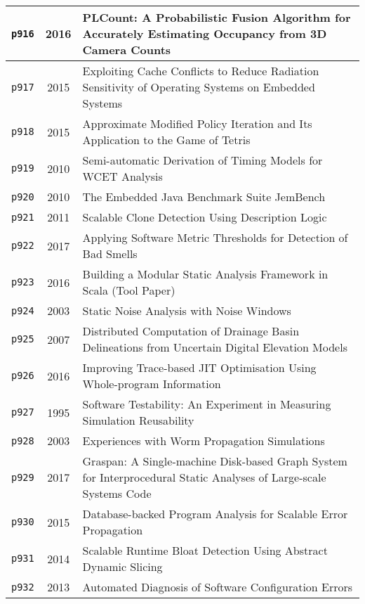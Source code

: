 \begin{longtable}{| c | c | p{16cm} |}
  \hline
  \texttt{p916} & 2016 & PLCount: A Probabilistic Fusion Algorithm for Accurately Estimating Occupancy from 3D Camera Counts \\
  \hline
  \texttt{p917} & 2015 & Exploiting Cache Conflicts to Reduce Radiation Sensitivity of Operating Systems on Embedded Systems \\
  \hline
  \texttt{p918} & 2015 & Approximate Modified Policy Iteration and Its Application to the Game of Tetris \\
  \hline
  \texttt{p919} & 2010 & Semi-automatic Derivation of Timing Models for WCET Analysis \\
  \hline
  \texttt{p920} & 2010 & The Embedded Java Benchmark Suite JemBench \\
  \hline
  \texttt{p921} & 2011 & Scalable Clone Detection Using Description Logic \\
  \hline
  \texttt{p922} & 2017 & Applying Software Metric Thresholds for Detection of Bad Smells \\
  \hline
  \texttt{p923} & 2016 & Building a Modular Static Analysis Framework in Scala (Tool Paper) \\
  \hline
  \texttt{p924} & 2003 & Static Noise Analysis with Noise Windows \\
  \hline
  \texttt{p925} & 2007 & Distributed Computation of Drainage Basin Delineations from Uncertain Digital Elevation Models \\
  \hline
  \texttt{p926} & 2016 & Improving Trace-based JIT Optimisation Using Whole-program Information \\
  \hline
  \texttt{p927} & 1995 & Software Testability: An Experiment in Measuring Simulation Reusability \\
  \hline
  \texttt{p928} & 2003 & Experiences with Worm Propagation Simulations \\
  \hline
  \texttt{p929} & 2017 & Graspan: A Single-machine Disk-based Graph System for Interprocedural Static Analyses of Large-scale Systems Code \\
  \hline
  \texttt{p930} & 2015 & Database-backed Program Analysis for Scalable Error Propagation \\
  \hline
  \texttt{p931} & 2014 & Scalable Runtime Bloat Detection Using Abstract Dynamic Slicing \\
  \hline
  \texttt{p932} & 2013 & Automated Diagnosis of Software Configuration Errors \\
  \hline
\end{longtable}
